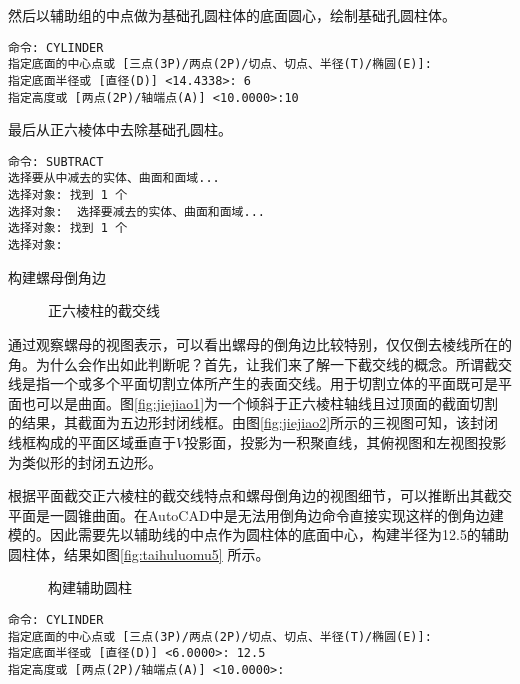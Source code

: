 \begin{procedure}
然后以辅助组的中点做为基础孔圆柱体的底面圆心，绘制基础孔圆柱体。

\begin{lstlisting}
命令: CYLINDER
指定底面的中心点或 [三点(3P)/两点(2P)/切点、切点、半径(T)/椭圆(E)]:
指定底面半径或 [直径(D)] <14.4338>: 6
指定高度或 [两点(2P)/轴端点(A)] <10.0000>:10
\end{lstlisting}

最后从正六棱体中去除基础孔圆柱。

\begin{lstlisting}
命令: SUBTRACT
选择要从中减去的实体、曲面和面域...
选择对象: 找到 1 个
选择对象:  选择要减去的实体、曲面和面域...
选择对象: 找到 1 个
选择对象:
\end{lstlisting}

\item 构建螺母倒角边

 \begin{figure}[htbp]
 \centering
{}\hspace{30pt}
\caption{正六棱柱的截交线}
\end{figure}

通过观察螺母的视图表示，可以看出螺母的倒角边比较特别，仅仅倒去棱线所在的角。为什么会作出如此判断呢？首先，让我们来了解一下截交线的概念。所谓截交线是指一个或多个平面切割立体所产生的表面交线。用于切割立体的平面既可是平面也可以是曲面。图\ref{fig:jiejiao1}为一个倾斜于正六棱柱轴线且过顶面的截面切割的结果，其截面为五边形封闭线框。由图\ref{fig:jiejiao2}所示的三视图可知，该封闭线框构成的平面区域垂直于$V$投影面，投影为一积聚直线，其俯视图和左视图投影为类似形的封闭五边形。

根据平面截交正六棱柱的截交线特点和螺母倒角边的视图细节，可以推断出其截交平面是一圆锥曲面。在AutoCAD中是无法用倒角边命令直接实现这样的倒角边建模的。因此需要先以辅助线的中点作为圆柱体的底面中心，构建半径为12.5的辅助圆柱体，结果如图\ref{fig:taihuluomu5} 所示。

\begin{figure}[htbp]
\centering
{}\hspace{20pt}
\caption{构建辅助圆柱}
\end{figure}

\begin{lstlisting}
命令: CYLINDER
指定底面的中心点或 [三点(3P)/两点(2P)/切点、切点、半径(T)/椭圆(E)]:
指定底面半径或 [直径(D)] <6.0000>: 12.5
指定高度或 [两点(2P)/轴端点(A)] <10.0000>:
\end{lstlisting}


\end{procedure}
